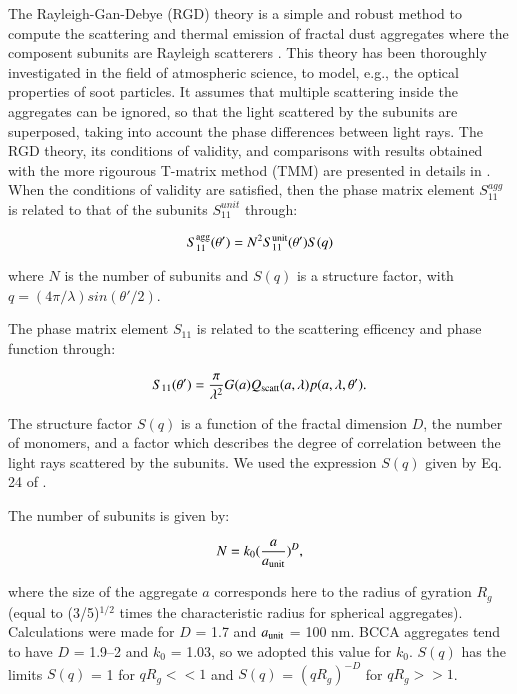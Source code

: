 \documentclass[a4paper,fleqn,usenatbib]{mnras}
\begin{document}
The Rayleigh-Gan-Debye (RGD) theory is a simple and robust method to compute the scattering and thermal emission of fractal dust aggregates where the composent subunits are  Rayleigh scatterers \citep{Tazaki2016}. This theory has been thoroughly investigated
in the field of atmospheric science, to model, e.g., the optical properties of soot particles. It assumes that multiple scattering inside the aggregates can be ignored, so that the light scattered by the subunits are superposed, taking into account the phase differences between light rays. The RGD theory, its conditions of validity, and comparisons with results obtained with the more rigourous T-matrix method (TMM)  are presented in details in \citet{Tazaki2016}.
When the conditions of validity are satisfied, then the phase matrix element $S_{11}^{agg}$ is related to that of the subunits $S_{11}^{unit}$ through:

\begin{equation}\label{eq:rgd}
S_{11}^{\rm agg}(\theta') = N^2 S_{11}^{\rm unit}(\theta') S(q)
 \end{equation}

\noindent
where $N$ is the number of subunits and $S(q)$ is a structure factor, with $q = (4\pi/\lambda)sin(\theta'/2)$.

The phase matrix element $S_{11}$ is related to the scattering efficency and phase function through:

\begin{equation}\label{eq:S11}
S_{11}(\theta') = \frac{\pi}{\lambda^2} G(a) Q_{\rm scatt}(a,\lambda) p(a,\lambda,\theta').
\end{equation}


The structure factor $S(q)$ is a function of the fractal dimension $D$, the number of monomers, and a factor which describes the degree of correlation between the light rays scattered by the subunits. We used the expression $S(q)$ given by Eq. 24
of \citet{Tazaki2016}.

The number of subunits is given by:

\begin{equation}
N = k_0 (\frac{a}{a_{\rm unit}})^D,
\end{equation}

\noindent
where the size of the aggregate $a$ corresponds here to the radius of gyration $R_g$ (equal to (3/5)$^{ 1/2}$ times the characteristic radius for spherical aggregates). Calculations were made for  $D$ = 1.7 and $a_{\rm unit}$ = 100 nm. BCCA aggregates tend to have $D$ = 1.9--2
and $k_0$ = 1.03, so we adopted this value for $k_0$. $S(q)$ has the limits $S(q)$ = 1 for $qR_g << 1$ and $S(q)$ = $(qR_g)^{-D}$ for $qR_g >> 1$.
\end{document}
